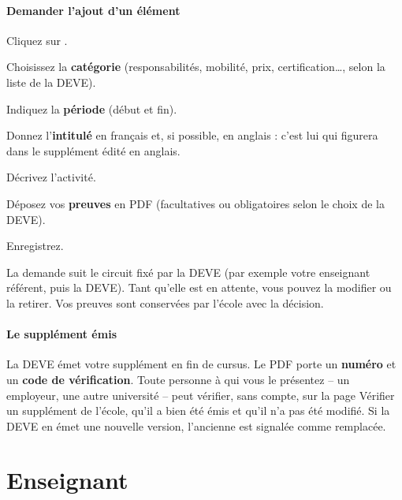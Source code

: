 \documentclass[11pt,a4paper]{article}
\begin{document}
\subsection{Demander l'ajout d'un élément}

\begin{etapes}
  \item Cliquez sur .
  \item Choisissez la \textbf{catégorie} (responsabilités, mobilité, prix, certification\dots,
    selon la liste de la DEVE).
  \item Indiquez la \textbf{période} (début et fin).
  \item Donnez l'\textbf{intitulé} en français et, si possible, en anglais : c'est lui qui
    figurera dans le supplément édité en anglais.
  \item Décrivez l'activité.
  \item Déposez vos \textbf{preuves} en PDF (facultatives ou obligatoires selon le choix de la
    DEVE).
  \item Enregistrez.
\end{etapes}


La demande suit le circuit fixé par la DEVE (par exemple votre enseignant référent, puis la
DEVE). Tant qu'elle est en attente, vous pouvez la modifier ou la retirer. Vos preuves sont
conservées par l'école avec la décision.

\subsection{Le supplément émis}

La DEVE émet votre supplément en fin de cursus. Le PDF porte un \textbf{numéro} et un
\textbf{code de vérification}. Toute personne à qui vous le présentez -- un employeur, une
autre université -- peut vérifier, sans compte, sur la page \og Vérifier un supplément\fg{} de
l'école, qu'il a bien été émis et qu'il n'a pas été modifié. Si la DEVE en émet une nouvelle
version, l'ancienne est signalée comme remplacée.


\newpage
\part{Enseignant}\label{part:enseignant}
\end{document}
